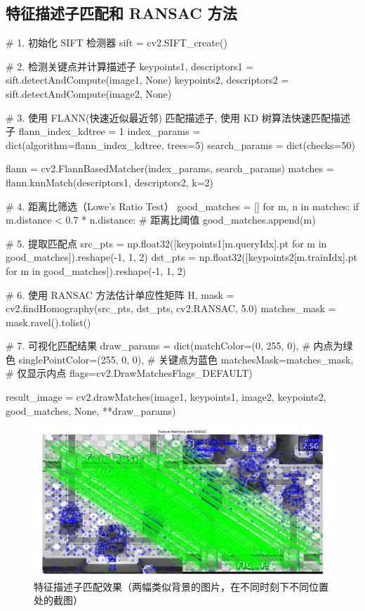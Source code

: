 \documentclass[12pt, a4paper, oneside]{ctexart}
\numberwithin{equation}{section}  %
\begin{document}
\subsection{特征描述子匹配和 RANSAC 方法}
\vspace{3ex}
\begin{pythoncode}
# 1. 初始化 SIFT 检测器
sift = cv2.SIFT_create()

# 2. 检测关键点并计算描述子
keypoints1, descriptors1 = sift.detectAndCompute(image1, None)
keypoints2, descriptors2 = sift.detectAndCompute(image2, None)

# 3. 使用 FLANN(快速近似最近邻) 匹配描述子, 使用 KD 树算法快速匹配描述子
flann_index_kdtree = 1
index_params = dict(algorithm=flann_index_kdtree, trees=5)
search_params = dict(checks=50)

flann = cv2.FlannBasedMatcher(index_params, search_params)
matches = flann.knnMatch(descriptors1, descriptors2, k=2)

# 4. 距离比筛选（Lowe's Ratio Test）
good_matches = []
for m, n in matches:
    if m.distance < 0.7 * n.distance:  # 距离比阈值
        good_matches.append(m)

# 5. 提取匹配点
src_pts = np.float32([keypoints1[m.queryIdx].pt for m in good_matches]).reshape(-1, 1, 2)
dst_pts = np.float32([keypoints2[m.trainIdx].pt for m in good_matches]).reshape(-1, 1, 2)

# 6. 使用 RANSAC 方法估计单应性矩阵
H, mask = cv2.findHomography(src_pts, dst_pts, cv2.RANSAC, 5.0)
matches_mask = mask.ravel().tolist()

# 7. 可视化匹配结果
draw_params = dict(matchColor=(0, 255, 0),  # 内点为绿色
                   singlePointColor=(255, 0, 0),  # 关键点为蓝色
                   matchesMask=matches_mask,  # 仅显示内点
                   flags=cv2.DrawMatchesFlags_DEFAULT)

result_image = cv2.drawMatches(image1, keypoints1, image2, keypoints2, good_matches, None, **draw_params)
\end{pythoncode}
\begin{figure}[htbp]
    \centering
    \includegraphics[width=\linewidth]{../code/results/2.png}
    \caption{特征描述子匹配效果（两幅类似背景的图片，在不同时刻下不同位置处的截图）}
    \label{lab-fig2}
\end{figure}
\end{document}
